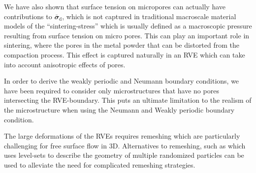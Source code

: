 \documentclass[12pt,a4paper]{article}
\renewcommand{\ts}[1]{\mathbfit{#1}}
\renewcommand{\dev}{\mathrm{d}}
\begin{document}
We have also shown that surface tension on micropores can actually have contributions to $\bar{\ts\sigma}_\dev$, which is not captured in traditional macroscale material models of the ``sintering-stress'' which is usually defined as a macroscopic pressure resulting from surface tension on micro pores.
This can play an important role in sintering, where the pores in the metal powder that can be distorted from the compaction process.
This effect is captured naturally in an RVE which can take into account anisotropic effects of pores.


In order to derive the weakly periodic and Neumann boundary conditions, we have been required to consider only microstructures that have no pores intersecting the RVE-boundary.
This puts an ultimate limitation to the realism of the microstructure when using the Neumann and Weakly periodic boundary condition.


The large deformations of the RVEs requires remeshing which are particularly challenging for free surface flow in 3D.
Alternatives to remeshing, such as \cite{pino_munoz_direct_2013} which uses level-sets to describe the geometry of multiple randomized particles can be used to alleviate the need for complicated remeshing strategies.


\printbibliography
\end{document}

